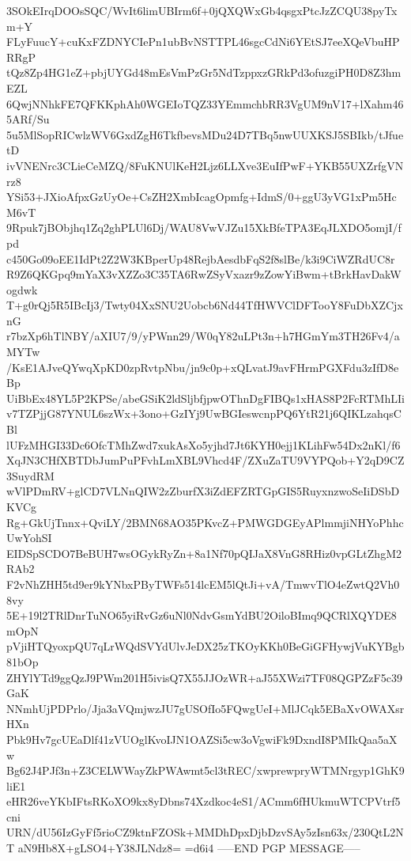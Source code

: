 3SOkEIrqDOOsSQC/WvIt6limUBIrm6f+0jQXQWxGb4qsgxPtcJzZCQU38pyTxm+Y
FLyFuucY+cuKxFZDNYCIePn1ubBvNSTTPL46sgcCdNi6YEtSJ7eeXQeVbuHPRRgP
tQz8Zp4HG1eZ+pbjUYGd48mEsVmPzGr5NdTzppxzGRkPd3ofuzgiPH0D8Z3hmEZL
6QwjNNhkFE7QFKKphAh0WGEIoTQZ33YEmmchbRR3VgUM9nV17+lXahm465ARf/Su
5u5MlSopRICwlzWV6GxdZgH6TkfbevsMDu24D7TBq5nwUUXKSJ5SBIkb/tJfuetD
ivVNENrc3CLieCeMZQ/8FuKNUlKeH2Ljz6LLXve3EuIfPwF+YKB55UXZrfgVNrz8
YSi53+JXioAfpxGzUyOe+CsZH2XmbIcagOpmfg+IdmS/0+ggU3yVG1xPm5HcM6vT
9Rpuk7jBObjhq1Zq2ghPLUl6Dj/WAU8VwVJZu15XkBfeTPA3EqJLXDO5omjI/fpd
c450Go09oEE1IdPt2Z2W3KBperUp48RejbAesdbFqS2f8slBe/k3i9CiWZRdUC8r
R9Z6QKGpq9mYaX3vXZZo3C35TA6RwZSyVxazr9zZowYiBwm+tBrkHavDakWogdwk
T+g0rQj5R5IBcIj3/Twty04XxSNU2Uobcb6Nd44TfHWVClDFTooY8FuDbXZCjxnG
r7bzXp6hTlNBY/aXIU7/9/yPWnn29/W0qY82uLPt3n+h7HGmYm3TH26Fv4/aMYTw
/KsE1AJveQYwqXpKD0zpRvtpNbu/jn9c0p+xQLvatJ9avFHrmPGXFdu3zIfD8eBp
UiBbEx48YL5P2KPSe/abeGSiK2ldSljbfjpwOThnDgFIBQs1xHAS8P2FcRTMhLIi
v7TZPjjG87YNUL6szWx+3ono+GzIYj9UwBGIeswcnpPQ6YtR21j6QIKLzahqsCBl
lUFzMHGI33Dc6OfcTMhZwd7xukAsXo5yjhd7Jt6KYH0ejj1KLihFw54Dx2nKl/f6
XqJN3CHfXBTDbJumPuPFvhLmXBL9Vhcd4F/ZXuZaTU9VYPQob+Y2qD9CZ3SuydRM
wVlPDmRV+glCD7VLNnQIW2zZburfX3iZdEFZRTGpGIS5RuyxnzwoSeIiDSbDKVCg
Rg+GkUjTnnx+QviLY/2BMN68AO35PKvcZ+PMWGDGEyAPlmmjiNHYoPhhcUwYohSI
EIDSpSCDO7BeBUH7wsOGykRyZn+8a1Nf70pQIJaX8VnG8RHiz0vpGLtZhgM2RAb2
F2vNhZHH5td9er9kYNbxPByTWFs514lcEM5lQtJi+vA/TmwvTlO4eZwtQ2Vh08vy
5E+19l2TRlDnrTuNO65yiRvGz6uNl0NdvGsmYdBU2OiloBImq9QCRlXQYDE8mOpN
pVjiHTQyoxpQU7qLrWQdSVYdUlvJeDX25zTKOyKKh0BeGiGFHywjVuKYBgb81bOp
ZHYlYTd9ggQzJ9PWm201H5ivisQ7X55JJOzWR+aJ55XWzi7TF08QGPZzF5c39GaK
NNmhUjPDPrlo/Jja3aVQmjwzJU7gUSOfIo5FQwgUeI+MlJCqk5EBaXvOWAXsrHXn
Pbk9Hv7gcUEaDlf41zVUOglKvoIJN1OAZSi5cw3oVgwiFk9DxndI8PMIkQaa5aXw
Bg62J4PJf3n+Z3CELWWayZkPWAwmt5cl3tREC/xwprewpryWTMNrgyp1GhK9liE1
eHR26veYKbIFtsRKoXO9kx8yDbns74Xzdkoc4eS1/ACmm6fHUkmuWTCPVtrf5cni
URN/dU56IzGyFf5rioCZ9ktnFZOSk+MMDhDpxDjbDzvSAy5zIsn63x/230QtL2NT
aN9Hb8X+gLSO4+Y38JLNdz8=
=d6i4
-----END PGP MESSAGE-----
